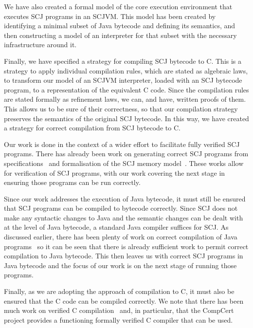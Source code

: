 We have also created a formal model of the core execution environment
that executes SCJ programs in an SCJVM.
This model has been created by identifying a minimal subset of Java
bytecode and defining its semantics, and then constructing a \Circus{}
model of an interpreter for that subset with the necessary
infrastructure around it.

Finally, we have specified a strategy for compiling SCJ bytecode to
C.
This is a strategy to apply individual compilation rules, which are
stated as algebraic laws, to transform our model of an SCJVM
interpreter, loaded with an SCJ bytecode program, to a \Circus{}
representation of the equivalent C code.
Since the compilation rules are stated formally as \Circus{}
refinement laws, we can, and have, written proofs of them.
This allows us to be sure of their correctness, so that our
compilation strategy preserves the semantics of the original SCJ
bytecode.
In this way, we have created a strategy for correct compilation from
SCJ bytecode to C.

Our work is done in the context of a wider effort to facilitate fully
verified SCJ programs.
There has already been work on generating correct SCJ programs from
\Circus{} specifications~\cite{cavalcanti2011, cavalcanti2013} and
formalisation of the SCJ memory model~\cite{cavalcanti2011a}.
These works allow for verification of SCJ programs, with our work
covering the next stage in ensuring those programs can be run
correctly.

Since our work addresses the execution of Java bytecode, it must still
be ensured that SCJ programs can be compiled to bytecode correctly.
Since SCJ does not make any syntactic changes to Java and the
semantic changes can be dealt with at the level of Java bytecode, a
standard Java compiler suffices for SCJ.
As discussed earlier, there has been plenty of work on correct
compilation of Java programs~\cite{klein2006, strecker2002,
  lochbihler2010, duran2005, stark2001} so it can be seen that there
is already sufficient work to permit correct compilation to Java
bytecode.
This then leaves us with correct SCJ programs in Java bytecode and the
focus of our work is on the next stage of running those programs.

Finally, as we are adopting the approach of compilation to C, it must
also be ensured that the C code can be compiled correctly.
We note that there has been much work on verified C
compilation~\cite{leroy2009a, leroy2009b, leroy2012, leinenbach2005,
  blazy2006} and, in particular, that the CompCert project provides a
functioning formally verified C compiler that can be used.

